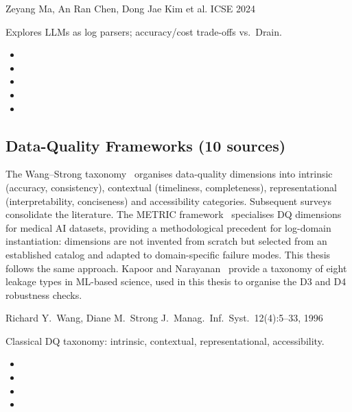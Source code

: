 {Zeyang Ma, An Ran Chen, Dong Jae Kim et al.}
{ICSE 2024}
{Explores LLMs as log parsers; accuracy/cost trade-offs vs.\ Drain.
\begin{itemize}[nosep]
  \item {}
  \item {}
  \item {}
  \item {}
  \item {}
\end{itemize}}

\subsection{Data-Quality Frameworks (10 sources)}
\label{sec:bg-dq}

The Wang--Strong taxonomy~\cite{wang1996} organises data-quality
dimensions into intrinsic (accuracy, consistency), contextual
(timeliness, completeness), representational (interpretability,
conciseness) and accessibility categories. Subsequent
surveys~\cite{batini2009,gong2023,zhou2024} consolidate the
literature. The METRIC framework~\cite{schwabe2024} specialises DQ
dimensions for medical AI datasets, providing a methodological
precedent for log-domain instantiation: dimensions are not invented
from scratch but selected from an established catalog and adapted to
domain-specific failure modes. This thesis follows the same approach.
Kapoor and Narayanan~\cite{kapoor2023} provide a taxonomy of eight
leakage types in ML-based science, used in this thesis to organise the
D3 and D4 robustness checks.

{Richard Y.\ Wang, Diane M.\ Strong}
{J.\ Manag.\ Inf.\ Syst.\ 12(4):5--33, 1996}
{Classical DQ taxonomy: intrinsic, contextual, representational,
accessibility.
\begin{itemize}[nosep]
  \item {}
  \item {}
  \item {}
  \item {}
\end{itemize}}

